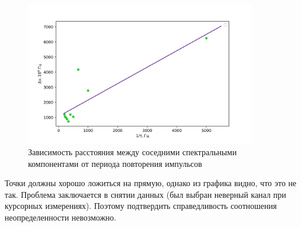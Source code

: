 \documentclass[a4paper,12pt]{article} %
\begin{document}
\begin{figure}[h!]
\begin{center}
\includegraphics[width=0.9\textwidth]{T(dnu)}
\caption{Зависимость расстояния между соседними спектральными компонентами от периода повторения импульсов} \label{dnu(T)_img}
\end{center}
\end{figure}

Точки должны хорошо ложиться на прямую, однако из графика видно, что это не так. Проблема заключается в снятии данных (был выбран неверный канал при курсорных измерениях). Поэтому подтвердить справедливость соотношения неопределенности невозможно. 
\end{document}
